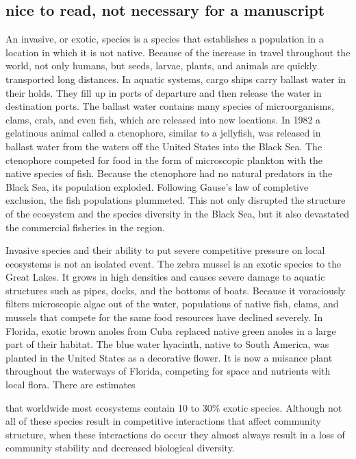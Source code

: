 \documentclass[%
 amsmath,amssymb,
 reprint,%
]{revtex4-2}
\begin{document}
\begin{widetext}
\iffalse
\newpage


\section{nice to read, not necessary for a manuscript}
An invasive, or exotic, species is a species that establishes a population in a location in which it is not native. Because of the increase in travel throughout the world, not only humans, but seeds, larvae, plants, and animals are quickly transported long distances. In aquatic systems, cargo ships carry ballast water in their holds. They fill up in ports of departure and then release the water in destination ports. The ballast water contains many species of microorganisms, clams, crab, and even fish, which are released into new locations. In 1982 a gelatinous animal called a ctenophore, similar to a jellyfish, was released in ballast water from the waters off the United States into the Black Sea. The ctenophore competed for food in the form of microscopic plankton with the native species of fish. Because the ctenophore had no natural predators in the Black Sea, its population exploded. Following Gause’s law of completive exclusion, the fish populations plummeted. This not only disrupted the structure of the ecosystem and the species diversity in the Black Sea, but it also devastated the commercial fisheries in the region.

Invasive species and their ability to put severe competitive pressure on local ecosystems is not an isolated event. The zebra mussel is an exotic species to the Great Lakes. It grows in high densities and causes severe damage to aquatic structures such as pipes, docks, and the bottoms of boats. Because it voraciously filters microscopic algae out of the water, populations of native fish, clams, and mussels that compete for the same food resources have declined severely. In Florida, exotic brown anoles from Cuba replaced native green anoles in a large part of their habitat. The blue water hyacinth, native to South America, was planted in the United States as a decorative flower. It is now a nuisance plant throughout the waterways of Florida, competing for space and nutrients with local flora. There are estimates

that worldwide most ecosystems contain 10 to 30\% exotic species. Although not all of these species result in competitive interactions that affect community structure, when these interactions do occur they almost always result in a loss of community stability and decreased biological diversity.


\end{widetext}
\end{document}

